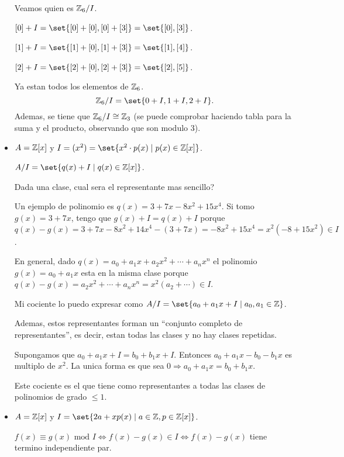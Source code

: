 \begin{example}
\begin{itemize}
		      Veamos quien es \(\mathbb{Z}_6/I \).
		      
		      \([0] + I = \set{[0] + [0], [0] + [3]} = \set{[0], [3]}\).
		      
		      \([1] + I = \set{[1] + [0], [1] + [3]} = \set{[1], [4]}\).
		      
		      \([2] + I = \set{[2] + [0], [2] + [3]} = \set{[2], [5 ]}\).
		      
		      Ya estan todos los elementos de \(\mathbb{Z}_6 \).
		      \[
			      \Z_6/I = \set{0 + I, 1 + I, 2 + I }.
		      \]
		      Ademas, se tiene que \(\mathbb{Z}_6/I \cong \mathbb{Z}_3 \) (se puede comprobar haciendo tabla para la suma y el producto, observando que son modulo 3).
		\item \(A = \mathbb{Z}[x ]\) y \(I = (x^{2} ) = \set{x^{2} \cdot p(x) \mid p(x ) \in \Z[x] }\).
		      
		      \(A/I = \set{q(x) + I \mid q(x) \in \Z[x ]}\).
		      
		      Dada una clase, cual sera el representante mas sencillo?
		      
		      Un ejemplo de polinomio es \(q(x) = 3 + 7x - 8x^{2} + 15x^{4}  \). Si tomo \(g(x) = 3 + 7x \), tengo que \(g(x) + I = q(x) + I \) porque \(q(x) - g(x) = 3 + 7x - 8x^{2} + 14x^{4} - (3 + 7x) = -8x^{2} + 15x^{4} = x^{2}(-8 + 15x^{2} ) \in I\).
		      
		      En general, dado \(q(x) = a_0 + a_1 x + a_2 x^{2} + \cdots + a_n x^{n } 	 \) el polinomio \(g(x) = a_0 + a_1 x \) esta en la misma clase porque \(q(x) - g(x) = a_2 x^{2} + \cdots + a_n x^{n} = x^{2} (a_2 + \cdots) \in I\).
		      
		      Mi cociente lo puedo expresar como \(A/I = \set{a_0 + a_1 x + I \mid a_0, a_1 \in \Z }\).
		      
		      Ademas, estos representantes forman un ``conjunto completo de representantes'', es decir, estan todas las clases y no hay clases repetidas.
		      
		      Supongamos que \(a_0 + a_{1} x + I = b_0 + b_1 x + I \). Entonces \(a_0 + a_1 x - b_0 - b_1 x \) es multiplo de \(x^{2 } \). La unica forma es que sea \(0 \Rightarrow a_0 + a_{1} x = b_0 + b_1 x \).
		      
		      Este cociente es el que tiene como representantes a todas las clases de polinomios de grado \(\leq 1 \).
		\item \(A = \mathbb{Z}[x ]\) y \(I = \set{2a + xp(x) \mid a \in \Z, p \in \Z[x ]}\).
		      
		      \(f(x) \equiv g(x) \text{ mod } I \iff   f(x) - g(x) \in I \iff f(x) - g(x)\) tiene termino independiente par.
		      

\end{itemize}
\end{example}
